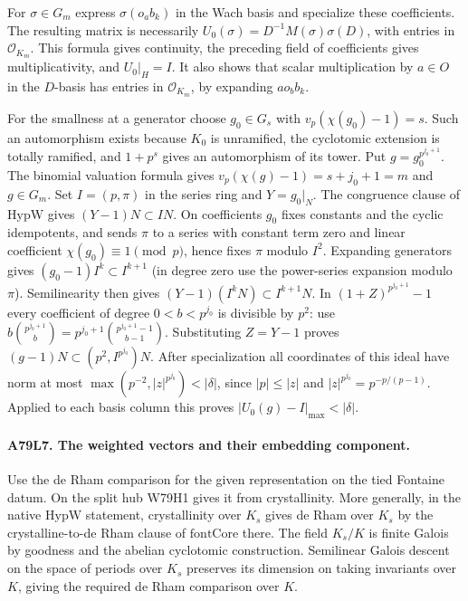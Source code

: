 For $\sigma\in G_m$ express $\sigma(o_a b_k)$ in the Wach basis and
specialize these coefficients. The resulting matrix is necessarily
$U_0(\sigma)=D^{-1}M(\sigma)\sigma(D)$, with entries in
$\mathcal O_{K_m}$. This formula gives continuity, the preceding
field of coefficients gives multiplicativity, and $U_0|_H=I$.
It also shows that scalar multiplication by $a\in O$ in the $D$-basis
has entries in $\mathcal O_{K_m}$, by expanding $a o_b b_k$.

For the smallness at a generator choose $g_0\in G_s$ with
$v_p(\chi(g_0)-1)=s$. Such an automorphism exists because $K_0$
is unramified, the cyclotomic extension is totally ramified,
and $1+p^s$ gives an automorphism of its tower. Put
$g=g_0^{p^{j_0+1}}$. The binomial valuation formula gives
$v_p(\chi(g)-1)=s+j_0+1=m$ and $g\in G_m$.
Set $I=(p,\pi)$ in the series ring and $Y=g_0|_N$.
The congruence clause of $\mathrm{HypW}$ gives $(Y-1)N\subset IN$.
On coefficients $g_0$ fixes constants and the cyclic idempotents,
and sends $\pi$ to a series with constant term zero and linear
coefficient $\chi(g_0)\equiv1\pmod p$, hence fixes $\pi$ modulo $I^2$.
Expanding generators gives $(g_0-1)I^k\subset I^{k+1}$
(in degree zero use the power-series expansion modulo $\pi$).
Semilinearity then gives $(Y-1)(I^kN)\subset I^{k+1}N$.
In $(1+Z)^{p^{j_0+1}}-1$ every coefficient of degree
$0<b<p^{j_0}$ is divisible by $p^2$: use
$b\binom{p^{j_0+1}}{b}=p^{j_0+1}\binom{p^{j_0+1}-1}{b-1}$.
Substituting $Z=Y-1$ proves $(g-1)N\subset(p^2,I^{p^{j_0}})N$.
After specialization all coordinates of this ideal have norm at most
$\max(p^{-2},|z|^{p^{j_0}})<|\delta|$,
since $|p|\le|z|$ and $|z|^{p^{j_0}}=p^{-p/(p-1)}$.
Applied to each basis column this proves $|U_0(g)-I|_{\max}<|\delta|$.

\paragraph{A79L7. The weighted vectors and their embedding component.}
Use the de Rham comparison for the given representation on the tied
Fontaine datum. On the split hub W79H1 gives it from crystallinity.
More generally, in the native $\mathrm{HypW}$ statement,
crystallinity over $K_s$ gives de Rham over $K_s$ by the
crystalline-to-de Rham clause of $\mathrm{fontCore}$ there.
The field $K_s/K$ is finite Galois by goodness and the abelian
cyclotomic construction. Semilinear Galois descent on the space
of periods over $K_s$ preserves its dimension on taking invariants
over $K$, giving the required de Rham comparison over $K$.

